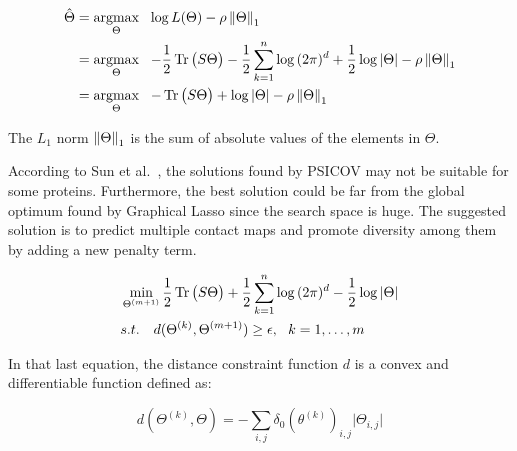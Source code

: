         \begin{equation}
            \begin{split}
                \hat{\Theta} & = \argmax_{\Theta} \ \ \log{L}(\Theta) - \rho \norm{\Theta}_1 \\
                & = \argmax_{\Theta} \ \ -\frac{1}{2} \trace\big(S \Theta\big) - \frac{1}{2} \sum\limits_{k=1}^{n}
                    \log{(2\pi)^d} + \frac{1}{2} \log{\vert\Theta\vert} - \rho \norm{\Theta}_1 \\
                & = \argmax_{\Theta} \ \ -\trace\big(S \Theta\big) + \log{\vert\Theta\vert} - \rho \norm{\Theta}_1 \\
            \end{split}
        \end{equation}

        The $L_1$ norm $\left\lVert\Theta\right\rVert_1$ is the sum of absolute values of the elements in $\Theta$.
        \todo{}



        According to Sun et al.~\cite{doi:10.1093/nar/gky995}, the solutions found by PSICOV may not be suitable for some proteins.
        Furthermore, the best solution could be far from the global optimum found by Graphical Lasso since the search space is huge.
        The suggested solution is to predict multiple contact maps and promote diversity among them by adding a new penalty term.

        \begin{equation}\label{mbest}
            \begin{split}
                & \min_{\Theta^{(m+1)}} \frac{1}{2} \operatorname{Tr}\big(S \Theta\big) + \frac{1}{2}
                    \sum\limits_{k=1}^{n} \log{(2\pi)^d} - \frac{1}{2} \log{\vert\Theta\vert} \\
                & s.t. \ \ \ d(\Theta^{(k)}, \Theta^{(m+1)}) \ge \epsilon, \ \ k = 1, \dotsc, m
            \end{split}
        \end{equation}

        In that last equation, the distance constraint function $d$ is a convex and differentiable function defined as:

        \begin{equation}
            d(\Theta^{(k)}, \Theta) = - \sum\limits_{i, j} \delta_0(\theta^{(k)})_{i, j} \vert \Theta_{i, j} \vert
        \end{equation}

